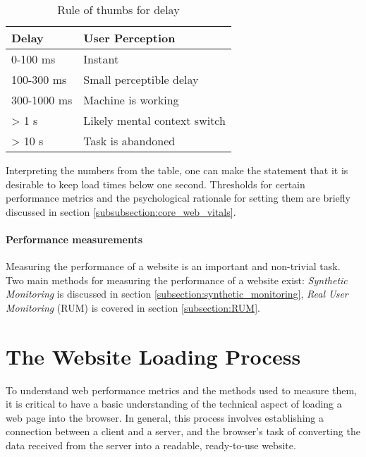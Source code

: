 \begin{table}[h]
	\small
	\centering
	\begin{tabular}{| l | l | }
	\hline
	Delay \cellcolor{lightgrey} & User Perception \cellcolor{lightgrey} \\
	\hline
	0-100 ms & Instant \\
	100-300 ms & Small perceptible delay \\
	300-1000 ms & Machine is working \\
	> 1 s & Likely mental context switch \\
	> 10 s & Task is abandoned \\
	\hline
	\end{tabular}
	\medskip
	\caption{Rule of thumbs for delay}
	\label{table:perception}
\end{table}

Interpreting the numbers from the table, one can make the statement that it is desirable to keep load times below one second.
Thresholds for certain performance metrics and the psychological rationale for setting them are briefly discussed in section \ref{subsubsection:core_web_vitals}.




\paragraph{Performance measurements}

Measuring the performance of a website is an important and non-trivial task.
Two main methods for measuring the performance of a website exist:
\textit{Synthetic Monitoring} is discussed in section \ref{subsection:synthetic_monitoring},
\textit{Real User Monitoring} (RUM) is covered in section \ref{subsection:RUM}.


\section{The Website Loading Process} %
\label{section:website_loading_process}


To understand web performance metrics and the methods used to measure them, it is critical to have a basic understanding of the technical aspect of loading a web page into the browser. 
In general, this process involves establishing a connection between a client and a server, and the browser's task of converting the data received from the server into a readable, ready-to-use website.

